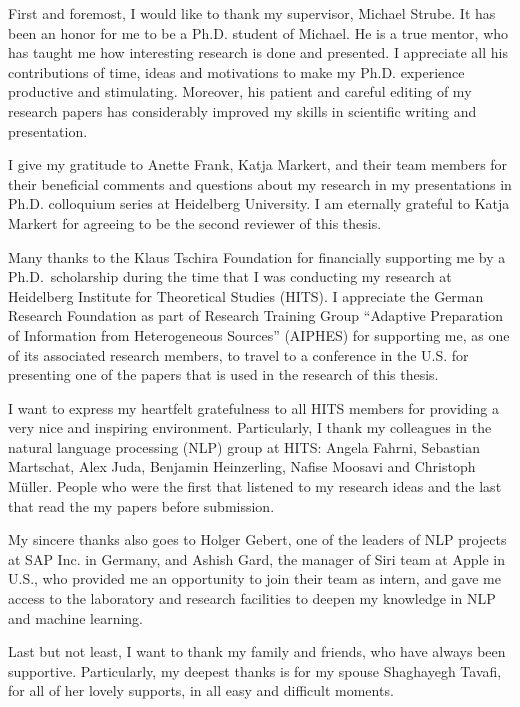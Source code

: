 
First and foremost, I would like to thank my supervisor, Michael Strube. 
It has been an honor for me to be a Ph.D. student of Michael. 
He is a true mentor, who has taught me how interesting research is done and presented. 
I appreciate all his contributions of time, ideas and motivations to make my Ph.D. experience productive and stimulating. 
Moreover, his patient and careful editing of my research papers has considerably improved my skills in scientific writing and presentation. 

I give my gratitude to Anette Frank, Katja Markert, and their team members for their beneficial comments and questions about my research in my presentations in Ph.D. colloquium series at Heidelberg University. 
I am eternally grateful to Katja Markert for agreeing to be the second reviewer of this thesis. 

Many thanks to the Klaus Tschira Foundation for financially supporting me by a Ph.D.\ scholarship during the time that I was conducting my research at Heidelberg Institute for Theoretical Studies (HITS). 
I appreciate the German Research Foundation as part of Research Training Group “Adaptive Preparation of Information from Heterogeneous Sources” (AIPHES) for supporting me, as one of its associated research members, to travel to a conference in the U.S. for presenting one of the papers that is used in the research of this thesis.  

I want to express my heartfelt gratefulness to all HITS members for providing a very nice and inspiring environment. 
Particularly, I thank my colleagues in the natural language processing (NLP) group at HITS:
Angela Fahrni, Sebastian Martschat, Alex Juda, Benjamin Heinzerling, Nafise Moosavi and Christoph M{\"u}ller. 
People who were the first that listened to my research ideas and the last that read the my papers before submission. 

My sincere thanks also goes to Holger Gebert, one of the leaders of NLP projects at SAP Inc. in Germany, and Ashish Gard, the manager of Siri team at  Apple in U.S., who provided me an opportunity to join their team as intern, and gave me access to the laboratory and research facilities to deepen my knowledge in NLP and machine learning. 

Last but not least, I want to thank my family and friends, who have always been supportive. 
Particularly, my deepest thanks is for my spouse Shaghayegh Tavafi, for all of her lovely supports, in all easy and difficult moments. 
